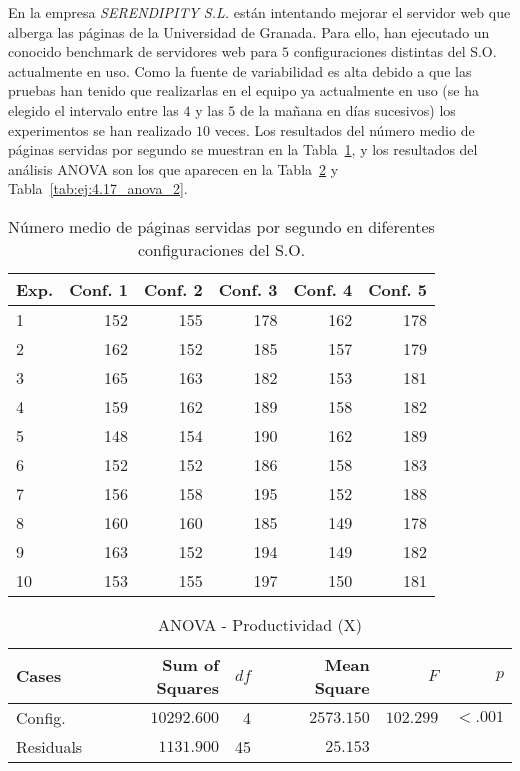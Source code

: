 \begin{ejercicio}\label{ej:4.17}
En la empresa \emph{SERENDIPITY S.L.} están intentando mejorar el servidor web que alberga las páginas de la Universidad de Granada. Para ello, han ejecutado un conocido benchmark de servidores web para $5$ configuraciones distintas del S.O. actualmente en uso. Como la fuente de variabilidad es alta debido a que las pruebas han tenido que realizarlas en el equipo ya actualmente en uso (se ha elegido el intervalo entre las $4$ y las $5$ de la mañana en días sucesivos) los experimentos se han realizado $10$ veces. Los resultados del número medio de páginas servidas por segundo se muestran en la Tabla~\ref{tab:ej:4.17}, y los resultados del análisis ANOVA son los que aparecen en la Tabla~\ref{tab:ej:4.17_anova_1} y Tabla~\ref{tab:ej:4.17_anova_2}.
\begin{table}[h]
\centering
\begin{tabular}{@{}lrrrrr@{}}
\toprule
Exp. & Conf. 1 & Conf. 2 & Conf. 3 & Conf. 4 & Conf. 5 \\ \midrule
1 & 152 & 155 & 178 & 162 & 178 \\
2 & 162 & 152 & 185 & 157 & 179 \\
3 & 165 & 163 & 182 & 153 & 181 \\
4 & 159 & 162 & 189 & 158 & 182 \\
5 & 148 & 154 & 190 & 162 & 189 \\
6 & 152 & 152 & 186 & 158 & 183 \\
7 & 156 & 158 & 195 & 152 & 188 \\
8 & 160 & 160 & 185 & 149 & 178 \\
9 & 163 & 152 & 194 & 149 & 182 \\
10 & 153 & 155 & 197 & 150 & 181 \\ \bottomrule
\end{tabular}
\caption{Número medio de páginas servidas por segundo en diferentes configuraciones del S.O.}
\label{tab:ej:4.17}
\end{table}

\begin{table}[h]
\centering
\begin{tabular}{@{}lrrrrr@{}}
\toprule
Cases & Sum of Squares & $df$ & Mean Square & $F$ & $p$ \\
\midrule
Config. & $10292.600$ & 4 & $2573.150$ & $102.299$ & $< .001$ \\
Residuals & $1131.900$ & 45 & $25.153$ & & \\
\bottomrule
\end{tabular}
\caption{ANOVA - Productividad (X)}
\label{tab:ej:4.17_anova_1}
\end{table}


\end{ejercicio}
